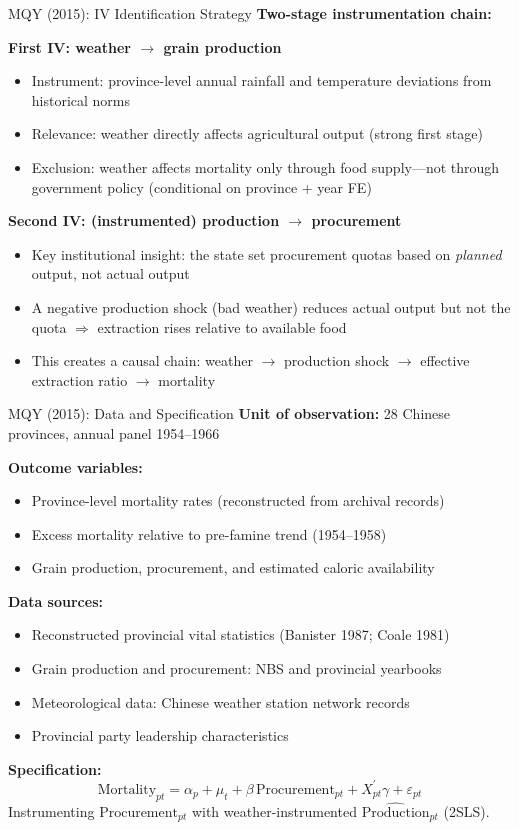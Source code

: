 \documentclass{beamer}
\begin{document}
\begin{frame}{MQY (2015): IV Identification Strategy}
\textbf{Two-stage instrumentation chain:}

\medskip
\textbf{First IV: weather $\to$ grain production}
\begin{itemize}
  \item Instrument: province-level annual rainfall and temperature
        deviations from historical norms
  \item Relevance: weather directly affects agricultural output (strong
        first stage)
  \item Exclusion: weather affects mortality only through food supply---not
        through government policy (conditional on province + year FE)
\end{itemize}

\medskip
\textbf{Second IV: (instrumented) production $\to$ procurement}
\begin{itemize}
  \item Key institutional insight: the state set procurement quotas based
        on \emph{planned} output, not actual output
  \item A negative production shock (bad weather) reduces actual output
        but not the quota $\Rightarrow$ extraction rises relative to
        available food
  \item This creates a causal chain: weather $\to$ production shock
        $\to$ effective extraction ratio $\to$ mortality
\end{itemize}
\end{frame}

\begin{frame}{MQY (2015): Data and Specification}
\textbf{Unit of observation:} 28 Chinese provinces, annual panel 1954--1966

\medskip
\textbf{Outcome variables:}
\begin{itemize}
  \item Province-level mortality rates (reconstructed from archival records)
  \item Excess mortality relative to pre-famine trend (1954--1958)
  \item Grain production, procurement, and estimated caloric availability
\end{itemize}

\medskip
\textbf{Data sources:}
\begin{itemize}
  \item Reconstructed provincial vital statistics (Banister 1987; Coale 1981)
  \item Grain production and procurement: NBS and provincial yearbooks
  \item Meteorological data: Chinese weather station network records
  \item Provincial party leadership characteristics
\end{itemize}

\medskip
\textbf{Specification:}
\[
\text{Mortality}_{pt} = \alpha_p + \mu_t + \beta\,\text{Procurement}_{pt}
  + X_{pt}^\prime\gamma + \varepsilon_{pt}
\]
Instrumenting $\text{Procurement}_{pt}$ with weather-instrumented
$\widehat{\text{Production}}_{pt}$ (2SLS).
\end{frame}
\end{document}
